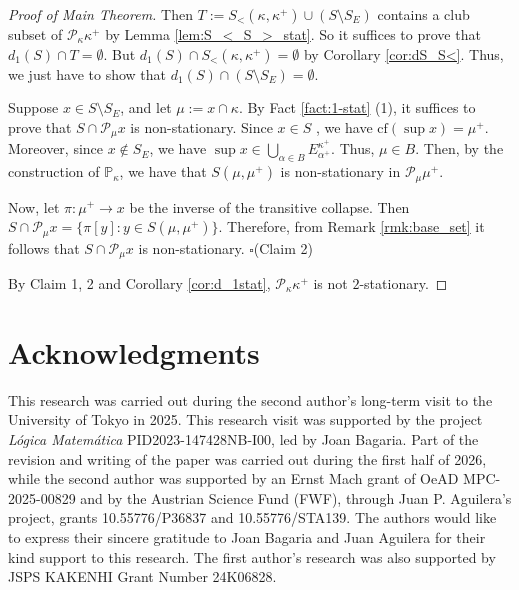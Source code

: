 \documentclass[a4paper,12pt,reqno,oneside]{amsart}
\theoremstyle{plain}
\newcommand{\cof}{\mathrm{cf}}
\newcommand{\mbb}{\mathbb}
\newcommand{\mcal}{\mathcal}
\begin{document}
\begin{proof}[Proof of Main Theorem]
Then $T := S_< ( \kappa , \kappa^+ ) \cup ( S \setminus S_E )$ contains a club subset of $\mcal{P}_\kappa \kappa^+$ by Lemma \ref{lem:S_<_S_>_stat}. So it suffices to prove that $d_1 (S) \cap T = \emptyset$. But $d_1 (S) \cap S_< ( \kappa , \kappa^+ ) = \emptyset$ by Corollary \ref{cor:dS_S<}. Thus, we just have to  show that $d_1 (S) \cap ( S \setminus S_E ) = \emptyset$.

Suppose $x \in S \setminus S_E$, and let $\mu := x \cap \kappa$. By Fact \ref{fact:1-stat} (1), it suffices to prove that $S \cap \mcal{P}_\mu x$ is non-stationary. Since  $x \in S$ , we have  $\cof ( \sup x ) = \mu^+$. Moreover, since $x \notin S_E$, we have  $\sup x \in \bigcup_{\alpha \in B} E^{\kappa^+}_{\alpha^+}$. Thus, $\mu \in B$. Then,  by the construction of $\mbb{P}_\kappa$, we have that $S( \mu , \mu^+ )$ is non-stationary in $\mcal{P}_\mu \mu^+$.

Now, let $\pi : \mu^+ \to x$ be the inverse of the transitive collapse. Then $S \cap \mcal{P}_\mu x = \{ \pi [y] : y \in S( \mu , \mu^+ ) \}$. Therefore, from Remark \ref{rmk:base_set} it follows that $S \cap \mcal{P}_\mu x$ is non-stationary.
\hfill $\square$(Claim 2)

\medskip

By Claim 1, 2 and Corollary \ref{cor:d_1stat}, $\mcal{P}_\kappa \kappa^+$ is not $2$-stationary.
\end{proof}


\section*{Acknowledgments}

This research was carried out during the second author's long-term visit to the University of Tokyo in 2025. This research visit was supported by the project \emph{Lógica Matemática} PID2023-147428NB-I00, led by Joan Bagaria. Part of the revision and writing of the paper was carried out during the first half of 2026, while the second author was supported by an Ernst Mach grant of OeAD MPC-2025-00829 and  by the Austrian Science Fund (FWF), through Juan P. Aguilera’s project, grants 10.55776/P36837 and 10.55776/STA139. The authors would like to express their sincere gratitude to Joan Bagaria and Juan Aguilera for their kind support to this research. The first author's research was also supported by JSPS KAKENHI Grant Number 24K06828.
\end{document}

